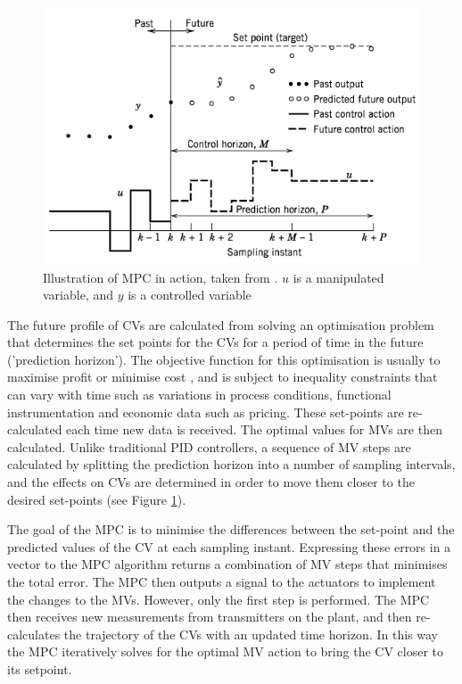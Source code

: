     \begin{figure}
        \centering
        \includegraphics[width=\linewidth]{chapters/4-operation-control/4-Figures/MPC-Seborg-2011.png}
        \caption{Illustration of MPC in action, taken from \textcite{}. $u$ is a manipulated variable, and $y$ is a controlled variable}
        \label{fig:MPC}
    \end{figure}
The future profile of CVs are calculated from solving an optimisation problem that determines the set points for the CVs for a period of time in the future ('prediction horizon'). The objective function for this optimisation is usually to maximise profit or minimise cost \cite{seborg_process_2011}, and is subject to inequality constraints that can vary with time such as variations in process conditions, functional instrumentation and economic data such as pricing. These set-points are re-calculated each time new data is received. The optimal values for MVs are then calculated. Unlike traditional PID controllers, a sequence of MV steps are calculated by splitting the prediction horizon into a number of sampling intervals, and the effects on CVs are determined in order to move them closer to the desired set-points (see Figure \ref{fig:MPC}). 


The goal of the MPC is to minimise the differences between the set-point and the predicted values of the CV at each sampling instant. Expressing these errors in a vector to the MPC algorithm returns a combination of MV steps that minimises the total error. The MPC then outputs a signal to the actuators to implement the changes to the MVs. However, only the first step is performed. The MPC then receives new measurements from transmitters on the plant, and then re-calculates the trajectory of the CVs with an updated time horizon. In this way the MPC iteratively solves for the optimal MV action to bring the CV closer to its setpoint. 

